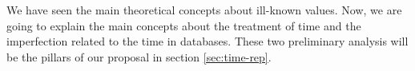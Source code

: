 %

We have seen the main theoretical concepts about ill-known values. Now, we are going to explain the main concepts about the treatment of time and the imperfection related to the time in databases. These two preliminary analysis will be the pillars of our proposal in section \ref{sec:time-rep}.



